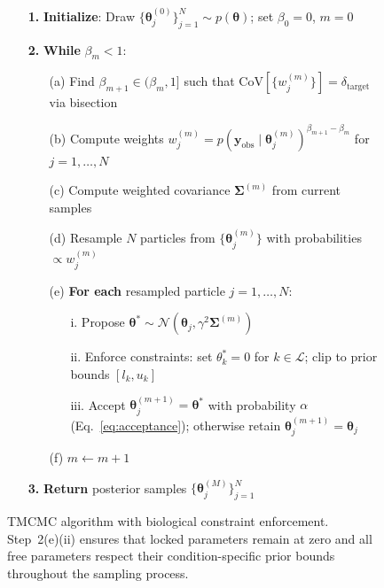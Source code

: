 \documentclass[11pt,a4paper]{article}
\begin{document}
\begin{figure}[htbp]
{\begin{minipage}{0.92\textwidth}
\begin{enumerate}
    \item[\textbf{1.}] \textbf{Initialize}: Draw $\{\boldsymbol{\theta}_j^{(0)}\}_{j=1}^{N} \sim p(\boldsymbol{\theta})$; set $\beta_0 = 0$, $m = 0$
    \item[\textbf{2.}] \textbf{While} $\beta_m < 1$:
    \begin{enumerate}
        \item[(a)] Find $\beta_{m+1} \in (\beta_m, 1]$ such that $\mathrm{CoV}[\{w_j^{(m)}\}] = \delta_{\mathrm{target}}$ via bisection
        \item[(b)] Compute weights $w_j^{(m)} = p(\mathbf{y}_{\mathrm{obs}} \mid \boldsymbol{\theta}_j^{(m)})^{\beta_{m+1} - \beta_m}$ for $j = 1, \ldots, N$
        \item[(c)] Compute weighted covariance $\boldsymbol{\Sigma}^{(m)}$ from current samples
        \item[(d)] Resample $N$ particles from $\{\boldsymbol{\theta}_j^{(m)}\}$ with probabilities $\propto w_j^{(m)}$
        \item[(e)] \textbf{For each} resampled particle $j = 1, \ldots, N$:
        \begin{enumerate}
            \item[i.] Propose $\boldsymbol{\theta}^* \sim \mathcal{N}(\boldsymbol{\theta}_j, \gamma^2 \boldsymbol{\Sigma}^{(m)})$
            \item[ii.] Enforce constraints: set $\theta_k^* = 0$ for $k \in \mathcal{L}$; clip to prior bounds $[l_k, u_k]$
            \item[iii.] Accept $\boldsymbol{\theta}_j^{(m+1)} = \boldsymbol{\theta}^*$ with probability $\alpha$ (Eq.~\ref{eq:acceptance}); otherwise retain $\boldsymbol{\theta}_j^{(m+1)} = \boldsymbol{\theta}_j$
        \end{enumerate}
        \item[(f)] $m \leftarrow m + 1$
    \end{enumerate}
    \item[\textbf{3.}] \textbf{Return} posterior samples $\{\boldsymbol{\theta}_j^{(M)}\}_{j=1}^{N}$
\end{enumerate}
\vspace{0.2cm}
\end{minipage}}
\caption{TMCMC algorithm with biological constraint enforcement. Step~2(e)(ii) ensures that locked parameters remain at zero and all free parameters respect their condition-specific prior bounds throughout the sampling process.}
\label{alg:tmcmc1}
\end{figure}
\end{document}
